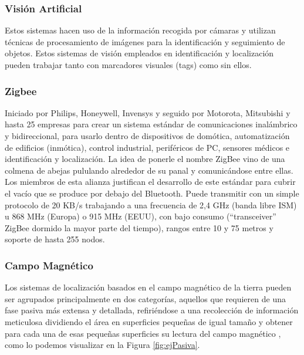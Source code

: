 \subsubsection{Visión Artificial}

Estos sistemas hacen uso de la información recogida por cámaras y utilizan técnicas de procesamiento de imágenes para la identificación y seguimiento de objetos. Estos sistemas de visión empleados en identificación y localización pueden trabajar tanto con marcadores visuales (tags) como sin ellos. 

\subsubsection{Zigbee}

Iniciado por Philips, Honeywell, Invensys y seguido por Motorota, Mitsubishi y hasta 25 empresas para crear un sistema estándar de comunicaciones inalámbrico y bidireccional, para usarlo dentro de dispositivos de domótica, automatización de edificios (inmótica), control industrial, periféricos de PC, sensores médicos e identificación y localización. La idea de ponerle el nombre ZigBee vino de una colmena de abejas pululando alrededor de su panal y comunicándose entre ellas.
Los miembros de esta alianza justifican el desarrollo de este estándar para cubrir el vacío que se produce por debajo del Bluetooth. Puede transmitir con un simple protocolo de 20 KB/s trabajando a una frecuencia de 2,4 GHz (banda libre ISM) u 868 MHz (Europa) o 915 MHz (EEUU), con bajo consumo (“transceiver” ZigBee dormido la mayor parte del tiempo), rangos entre 10 y 75 metros y soporte de hasta 255 nodos. 

\subsubsection{Campo Magnético}

Los sistemas de localización basados en el campo magnético de la tierra pueden ser agrupados principalmente en dos categorías, aquellos que requieren de una fase pasiva más extensa y detallada, refiriéndose a una recolección de información meticulosa dividiendo el área en superficies pequeñas de igual tamaño y obtener para cada una de esas pequeñas superficies su lectura del campo magnético \cite{usoCampoMagnetico}, como lo podemos visualizar en la Figura \ref{fig:ejPasiva}.

